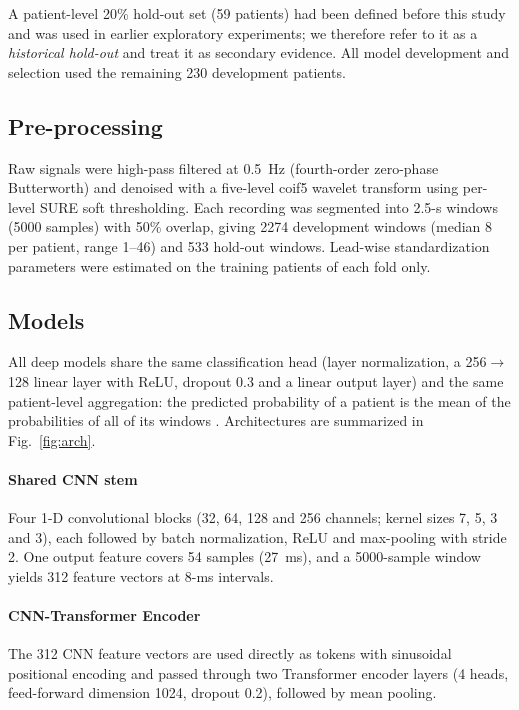 \documentclass[preprint,12pt]{elsarticle}
\begin{document}
A patient-level 20\% hold-out set (59 patients) had been defined before this study and was used in earlier exploratory experiments; we therefore refer to it as a \emph{historical hold-out} and treat it as secondary evidence. All model development and selection used the remaining 230 development patients.

\begin{table}[!htbp]
\centering
\caption{Cohort by site of origin.}
\label{tab:cohort}
\small

\end{table}

\subsection{Pre-processing}
Raw signals were high-pass filtered at 0.5~Hz (fourth-order zero-phase Butterworth) and denoised with a five-level coif5 wavelet transform using per-level SURE soft thresholding. Each recording was segmented into 2.5-s windows (5000 samples) with 50\% overlap, giving 2274 development windows (median 8 per patient, range 1--46) and 533 hold-out windows. Lead-wise standardization parameters were estimated on the training patients of each fold only.

\subsection{Models}
All deep models share the same classification head (layer normalization, a 256$\rightarrow$128 linear layer with ReLU, dropout 0.3 and a linear output layer) and the same patient-level aggregation: the predicted probability of a patient is the mean of the probabilities of all of its windows \cite{ilse2018mil}. Architectures are summarized in Fig.~\ref{fig:arch}.

\paragraph{Shared CNN stem} Four 1-D convolutional blocks (32, 64, 128 and 256 channels; kernel sizes 7, 5, 3 and 3), each followed by batch normalization, ReLU and max-pooling with stride 2. One output feature covers 54 samples (27~ms), and a 5000-sample window yields 312 feature vectors at 8-ms intervals.

\paragraph{CNN-Transformer Encoder} The 312 CNN feature vectors are used directly as tokens with sinusoidal positional encoding and passed through two Transformer encoder layers (4 heads, feed-forward dimension 1024, dropout 0.2), followed by mean pooling.
\end{document}
